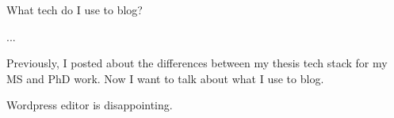 

What tech do I use to blog?

...

Previously, I posted about the differences between my thesis tech stack for my MS and PhD work. Now I want to talk about what I use to blog.

Wordpress editor is disappointing.

